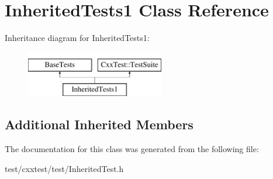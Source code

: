 \hypertarget{classInheritedTests1}{\section{Inherited\-Tests1 Class Reference}
\label{classInheritedTests1}
}
Inheritance diagram for Inherited\-Tests1\-:\begin{figure}[H]
\begin{center}
\leavevmode
\includegraphics[height=2.000000cm]{classInheritedTests1}
\end{center}
\end{figure}
\subsection*{Additional Inherited Members}


The documentation for this class was generated from the following file\-:\begin{DoxyCompactItemize}
\item 
test/cxxtest/test/Inherited\-Test.\-h\end{DoxyCompactItemize}
